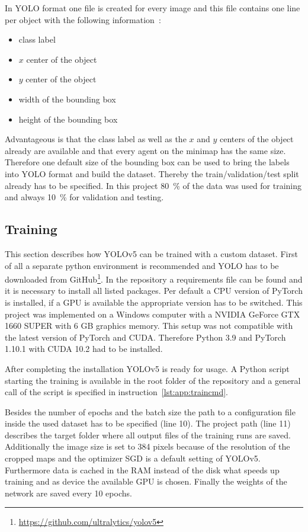 In YOLO format one file is created for every image and this file contains one line per object with the 
following information~\cite{yoloLabels}:

\begin{itemize}
	\item class label
	\item $x$ center of the object
	\item $y$ center of the object
	\item width of the bounding box
	\item height of the bounding box
\end{itemize}

Advantageous is that the class label as well as the $x$ and $y$ centers of the object already are 
available and that every agent on the minimap has the same size. Therefore one default size of the 
bounding box can be used to bring the labels into YOLO format and build the dataset. Thereby the 
train/validation/test split already has to be specified. In this project 80~\% of the data was used for 
training and always 10~\% for validation and testing.

\subsection{Training}\label{subsec:app:training}

This section describes how YOLOv5 can be trained with a custom dataset. First of all a separate 
python environment is recommended and YOLO has to be downloaded from 
GitHub\footnote{\url{https://github.com/ultralytics/yolov5}}.  In the repository a requirements file can 
be found and it is necessary to install all listed packages. Per default a CPU version of PyTorch is 
installed, if a GPU is available the appropriate version has to be switched. This project was 
implemented on a Windows computer with a NVIDIA GeForce GTX 1660 SUPER with 6 GB graphics 
memory. This setup was not compatible with the latest version of PyTorch and CUDA. Therefore 
Python 3.9 and PyTorch 1.10.1 with CUDA 10.2 had to be installed.

After completing the installation YOLOv5 is ready for usage. A Python script starting the training is 
available in the root folder of the repository and a general call of the script is specified in 
instruction~\ref{lst:app:traincmd}. 

Besides the number of epochs and the batch size the path to a configuration file inside the used 
dataset has to be specified (line 10). The project path (line 11) describes the target folder where all 
output files of the training runs are saved. Additionally the image size is set to 384 pixels because of 
the resolution of the cropped maps and the optimizer SGD is a default setting of YOLOv5. 
Furthermore data is cached in the RAM instead of the disk what speeds up training and as device the 
available GPU is chosen. Finally the weights of the network are saved every 10 epochs.

